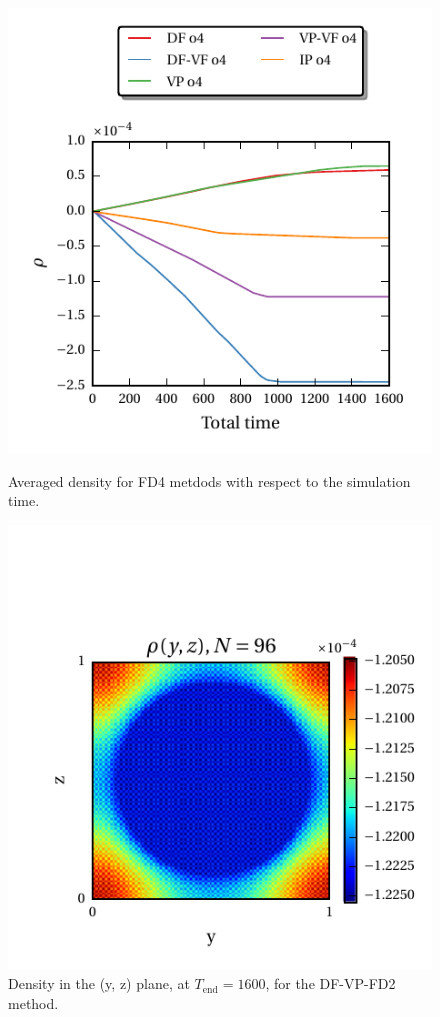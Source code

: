 \begin{figure}[!bp]
  \begin{minipage}[c]{0.5\textwidth}
      \includegraphics{gfx/immersed_boundary/hpflow/long/ts.pdf}
      \caption{\label{hpflow:results_long_ts}
            Averaged density for FD4 metdods with respect to the simulation time.
          }
  \end{minipage}
  \begin{minipage}[c]{0.5\textwidth}
      \includegraphics{gfx/immersed_boundary/hpflow/long/example.pdf}
      \caption{\label{hpflow:results_long_example}
        Density in the (y, z) plane, at $T_{\text{end}}=1600$, for the DF-VP-FD2 method.
      }
  \end{minipage}
\end{figure}


